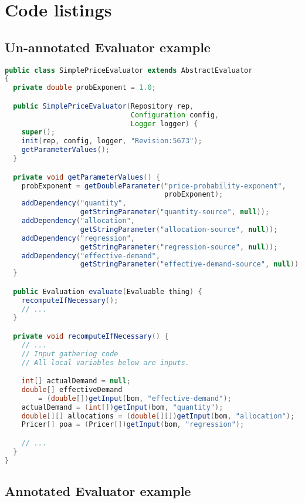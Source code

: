 \documentclass{article}
\begin{document}
\clearpage
\appendix

\section{Code listings}

\subsection{Un-annotated Evaluator example}
\label{sec:unannotatedeval}

{\small
\begin{lstlisting}[language={Java}]
public class SimplePriceEvaluator extends AbstractEvaluator
{
  private double probExponent = 1.0;

  public SimplePriceEvaluator(Repository rep,
                              Configuration config,
                              Logger logger) {
    super();
    init(rep, config, logger, "Revision:5673");
    getParameterValues();
  }

  private void getParameterValues() {
    probExponent = getDoubleParameter("price-probability-exponent",
                                      probExponent);
    addDependency("quantity",
                  getStringParameter("quantity-source", null));
    addDependency("allocation",
                  getStringParameter("allocation-source", null));
    addDependency("regression",
                  getStringParameter("regression-source", null));
    addDependency("effective-demand",
                  getStringParameter("effective-demand-source", null));
  }

  public Evaluation evaluate(Evaluable thing) {
    recomputeIfNecessary();
    // ...
  }

  private void recomputeIfNecessary() {
    // ...
    // Input gathering code
    // All local variables below are inputs.

    int[] actualDemand = null;
    double[] effectiveDemand
        = (double[])getInput(bom, "effective-demand");
    actualDemand = (int[])getInput(bom, "quantity");
    double[][] allocations = (double[][])getInput(bom, "allocation");
    Pricer[] poa = (Pricer[])getInput(bom, "regression");

    // ...
  }
}
\end{lstlisting}
}

\clearpage
\subsection{Annotated Evaluator example}
\label{sec:annotatedeval}
\end{document}
